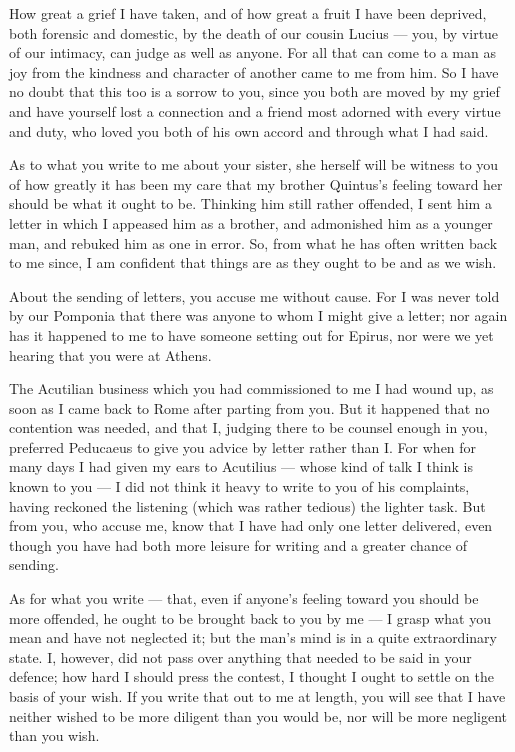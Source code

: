 

 How great a grief I have taken, and of how great a fruit I have been deprived, both forensic and domestic, by the death of our cousin Lucius --- you, by virtue of our intimacy, can judge as well as anyone. For all that can come to a man as joy from the kindness and character of another came to me from him. So I have no doubt that this too is a sorrow to you, since you both are moved by my grief and have yourself lost a connection and a friend most adorned with every virtue and duty, who loved you both of his own accord and through what I had said.

 As to what you write to me about your sister, she herself will be witness to you of how greatly it has been my care that my brother Quintus's feeling toward her should be what it ought to be. Thinking him still rather offended, I sent him a letter in which I appeased him as a brother, and admonished him as a younger man, and rebuked him as one in error. So, from what he has often written back to me since, I am confident that things are as they ought to be and as we wish.

 About the sending of letters, you accuse me without cause. For I was never told by our Pomponia that there was anyone to whom I might give a letter; nor again has it happened to me to have someone setting out for Epirus, nor were we yet hearing that you were at Athens.

 The Acutilian business which you had commissioned to me I had wound up, as soon as I came back to Rome after parting from you. But it happened that no contention was needed, and that I, judging there to be counsel enough in you, preferred Peducaeus to give you advice by letter rather than I. For when for many days I had given my ears to Acutilius --- whose kind of talk I think is known to you --- I did not think it heavy to write to you of his complaints, having reckoned the listening (which was rather tedious) the lighter task. But from you, who accuse me, know that I have had only one letter delivered, even though you have had both more leisure for writing and a greater chance of sending.

 As for what you write --- that, even if anyone's feeling toward you should be more offended, he ought to be brought back to you by me --- I grasp what you mean and have not neglected it; but the man's mind is in a quite extraordinary state. I, however, did not pass over anything that needed to be said in your defence; how hard I should press the contest, I thought I ought to settle on the basis of your wish. If you write that out to me at length, you will see that I have neither wished to be more diligent than you would be, nor will be more negligent than you wish.

